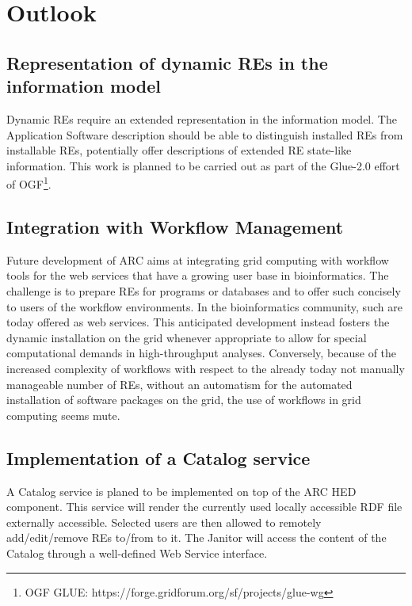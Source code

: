 \chapter{Outlook}
% 
% 

\section{Representation of dynamic REs in the information model}
Dynamic REs require an extended representation in the
information model.  The Application Software description should be able
to distinguish installed REs from installable REs, potentially offer
descriptions of extended RE state-like information. This work is planned
to be carried out as part of the Glue-2.0 effort of OGF\footnote{OGF
GLUE: https://forge.gridforum.org/sf/projects/glue-wg}.

\section{Integration with Workflow Management}

Future development of ARC aims at integrating grid computing with
workflow tools for the web services that have a growing user base in
bioinformatics. The challenge is to prepare REs for
programs or databases and to offer such concisely to users of the
workflow environments.  In the bioinformatics community, such are
today offered as web services.  This anticipated development instead
fosters the dynamic installation on the grid whenever appropriate to
allow for special computational demands in high-throughput analyses.
Conversely, because of the increased complexity of workflows with respect
to the already today not manually manageable number of REs, without an
automatism for the automated installation of software packages on the
grid, the use of workflows in grid computing seems mute.

\section{Implementation of a Catalog service}
 
A Catalog service is planed to be implemented on top of the ARC
HED component.  This service will render the currently used locally
accessible RDF file externally accessible. Selected users are then allowed
to remotely add/edit/remove REs to/from to it.  The Janitor will access
the content of the Catalog through a well-defined Web Service interface.

